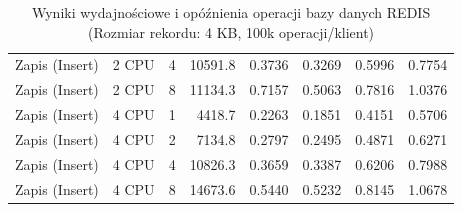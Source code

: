 \begin{table}[ht]
{\begin{tabular}{llcrrrrr}
Zapis (Insert) & 2 CPU & 4 & 10591.8 & 0.3736 & 0.3269 & 0.5996 & 0.7754 \\
Zapis (Insert) & 2 CPU & 8 & 11134.3 & 0.7157 & 0.5063 & 0.7816 & 1.0376 \\
Zapis (Insert) & 4 CPU & 1 & 4418.7 & 0.2263 & 0.1851 & 0.4151 & 0.5706 \\
Zapis (Insert) & 4 CPU & 2 & 7134.8 & 0.2797 & 0.2495 & 0.4871 & 0.6271 \\
Zapis (Insert) & 4 CPU & 4 & 10826.3 & 0.3659 & 0.3387 & 0.6206 & 0.7988 \\
Zapis (Insert) & 4 CPU & 8 & 14673.6 & 0.5440 & 0.5232 & 0.8145 & 1.0678 \\
\bottomrule
\end{tabular}%
}
\caption{Wyniki wydajnościowe i opóźnienia operacji bazy danych REDIS (Rozmiar rekordu: 4 KB, 100k operacji/klient)}
\label{tab:latency_redis_medium_100000}
\end{table}
